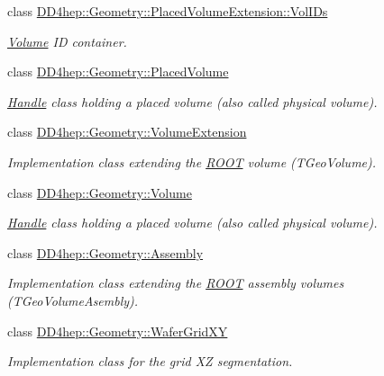 \begin{DoxyCompactItemize}
class \hyperlink{class_d_d4hep_1_1_geometry_1_1_placed_volume_extension_1_1_vol_i_ds}{DD4hep::Geometry::PlacedVolumeExtension::VolIDs}
\begin{DoxyCompactList}\small\item\em \hyperlink{class_d_d4hep_1_1_geometry_1_1_volume}{Volume} ID container. \item\end{DoxyCompactList}\item 
class \hyperlink{class_d_d4hep_1_1_geometry_1_1_placed_volume}{DD4hep::Geometry::PlacedVolume}
\begin{DoxyCompactList}\small\item\em \hyperlink{class_d_d4hep_1_1_handle}{Handle} class holding a placed volume (also called physical volume). \item\end{DoxyCompactList}\item 
class \hyperlink{class_d_d4hep_1_1_geometry_1_1_volume_extension}{DD4hep::Geometry::VolumeExtension}
\begin{DoxyCompactList}\small\item\em Implementation class extending the \hyperlink{namespace_r_o_o_t}{ROOT} volume (TGeoVolume). \item\end{DoxyCompactList}\item 
class \hyperlink{class_d_d4hep_1_1_geometry_1_1_volume}{DD4hep::Geometry::Volume}
\begin{DoxyCompactList}\small\item\em \hyperlink{class_d_d4hep_1_1_handle}{Handle} class holding a placed volume (also called physical volume). \item\end{DoxyCompactList}\item 
class \hyperlink{class_d_d4hep_1_1_geometry_1_1_assembly}{DD4hep::Geometry::Assembly}
\begin{DoxyCompactList}\small\item\em Implementation class extending the \hyperlink{namespace_r_o_o_t}{ROOT} assembly volumes (TGeoVolumeAsembly). \item\end{DoxyCompactList}\item 
class \hyperlink{class_d_d4hep_1_1_geometry_1_1_wafer_grid_x_y}{DD4hep::Geometry::WaferGridXY}
\begin{DoxyCompactList}\small\item\em Implementation class for the grid XZ segmentation. \item\end{DoxyCompactList}\item 

\end{DoxyCompactItemize}
